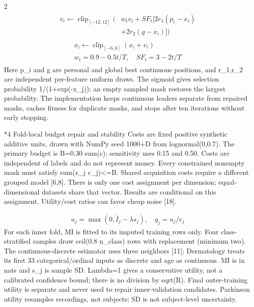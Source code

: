 \documentclass[10pt,a4paper]{article}
\makeatletter
\renewcommand{\section}{\@startsection{section}{1}{0pt}{5pt}{2pt}{\normalfont\normalsize\bfseries}}
\newcommand{\sect}[1]{\section*{#1}}
\makeatother
\begin{document}
\begin{multicols}{2}
\begin{equation}\begin{gathered}\begin{aligned}v_i\leftarrow\operatorname{clip}_{[-12,12]}\big(&w_t v_i+SF_t[2r_1(p_i-x_i)\\&+2r_2(g-x_i)]\big)\end{aligned}\end{gathered}\end{equation}
\begin{equation}\begin{gathered}\begin{gathered}x_i\leftarrow\operatorname{clip}_{[-6,6]}(x_i+v_i)\\w_t=0.9-0.5t/T,\quad SF_t=3-2t/T\end{gathered}\end{gathered}\end{equation}
Here p\_i and g are personal and global best continuous positions, and r\_1,r\_2 are independent per-feature uniform draws. The sigmoid gives selection probability 1/(1+exp(-x\_j)); an empty sampled mask restores the largest probability. The implementation keeps continuous leaders separate from repaired masks, caches fitness for duplicate masks, and stops after ten iterations without early stopping.

\sect{4  Fold-local budget repair and stability}
Costs are fixed positive synthetic additive units, drawn with NumPy seed 1000+D from lognormal(0,0.7). The primary budget is B=0.30 sum(c); sensitivity uses 0.15 and 0.50. Costs are independent of labels and do not represent money. Every constrained nonempty mask must satisfy sum(z\_j c\_j)<=B. Shared acquisition costs require a different grouped model [6,8]. There is only one cost assignment per dimension; equal-dimensional datasets share that vector. Results are conditional on this assignment. Utility/cost ratios can favor cheap noise [18].

\begin{equation}\begin{gathered}u_j=\max(0,\overline I_j-\lambda s_j),\quad q_j=u_j/c_j\end{gathered}\end{equation}
For each inner fold, MI is fitted to its imputed training rows only. Four class-stratified samples draw ceil(0.8 n\_class) rows with replacement (minimum two). The continuous-discrete estimator uses three neighbors [11]; Dermatology treats its first 33 categorical/ordinal inputs as discrete and age as continuous. MI is in nats and s\_j is sample SD. Lambda=1 gives a conservative utility, not a calibrated confidence bound; there is no division by sqrt(R). Final outer-training utility is separate and never used to repair inner-validation candidates. Parkinson utility resamples recordings, not subjects; SD is not subject-level uncertainty.


\end{multicols}
\end{document}
